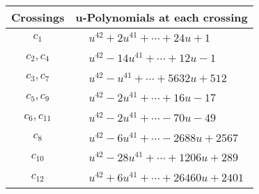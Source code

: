 \documentclass[1p]{elsarticle_modified}
\theoremstyle{definition}
\begin{document}
\begin{tabular}{m{50pt}|m{274pt}}
Crossings & \hspace{64pt}u-Polynomials at each crossing \\
\hline $$\begin{aligned}c_{1}\end{aligned}$$&$\begin{aligned}
&u^{42}+2 u^{41}+\cdots+24 u+1
\end{aligned}$\\
\hline $$\begin{aligned}c_{2},c_{4}\end{aligned}$$&$\begin{aligned}
&u^{42}-14 u^{41}+\cdots+12 u-1
\end{aligned}$\\
\hline $$\begin{aligned}c_{3},c_{7}\end{aligned}$$&$\begin{aligned}
&u^{42}- u^{41}+\cdots+5632 u+512
\end{aligned}$\\
\hline $$\begin{aligned}c_{5},c_{9}\end{aligned}$$&$\begin{aligned}
&u^{42}-2 u^{41}+\cdots+16 u-17
\end{aligned}$\\
\hline $$\begin{aligned}c_{6},c_{11}\end{aligned}$$&$\begin{aligned}
&u^{42}-2 u^{41}+\cdots-70 u-49
\end{aligned}$\\
\hline $$\begin{aligned}c_{8}\end{aligned}$$&$\begin{aligned}
&u^{42}-6 u^{41}+\cdots-2688 u+2567
\end{aligned}$\\
\hline $$\begin{aligned}c_{10}\end{aligned}$$&$\begin{aligned}
&u^{42}-28 u^{41}+\cdots+1206 u+289
\end{aligned}$\\
\hline $$\begin{aligned}c_{12}\end{aligned}$$&$\begin{aligned}
&u^{42}+6 u^{41}+\cdots+26460 u+2401
\end{aligned}$\\
\hline
\end{tabular}\\~\\
\end{document}
